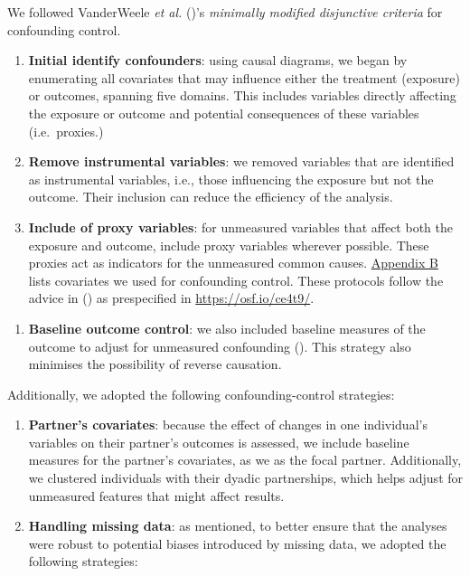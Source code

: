 \documentclass[
  singlecolumn]{article}
\providecommand{\tightlist}{%
  \setlength{\itemsep}{0pt}\setlength{\parskip}{0pt}}\usepackage{longtable,booktabs,array}
\begin{document}
We followed VanderWeele \emph{et al.}
()'s \emph{minimally modified
disjunctive criteria} for confounding control.

\begin{enumerate}
\def\labelenumi{\arabic{enumi}.}
\item
  \textbf{Initial identify confounders}: using causal diagrams, we began
  by enumerating all covariates that may influence either the treatment
  (exposure) or outcomes, spanning five domains. This includes variables
  directly affecting the exposure or outcome and potential consequences
  of these variables (i.e.~proxies.)
\item
  \textbf{Remove instrumental variables}: we removed variables that are
  identified as instrumental variables, i.e., those influencing the
  exposure but not the outcome. Their inclusion can reduce the
  efficiency of the analysis.
\item
  \textbf{Include of proxy variables}: for unmeasured variables that
  affect both the exposure and outcome, include proxy variables wherever
  possible. These proxies act as indicators for the unmeasured common
  causes. \hyperref[appendix-demographics]{Appendix B} lists covariates
  we used for confounding control. These protocols follow the advice in
  () as prespecified
  in \url{https://osf.io/ce4t9/}.
\end{enumerate}

\begin{enumerate}
\def\labelenumi{\arabic{enumi}.}
\setcounter{enumi}{2}
\tightlist
\item
  \textbf{Baseline outcome control}: we also included baseline measures
  of the outcome to adjust for unmeasured confounding
  (). This
  strategy also minimises the possibility of reverse causation.
\end{enumerate}

Additionally, we adopted the following confounding-control strategies:

\begin{enumerate}
\def\labelenumi{\arabic{enumi}.}
\setcounter{enumi}{5}
\item
  \textbf{Partner's covariates}: because the effect of changes in one
  individual's variables on their partner's outcomes is assessed, we
  include baseline measures for the partner's covariates, as we as the
  focal partner. Additionally, we clustered individuals with their
  dyadic partnerships, which helps adjust for unmeasured features that
  might affect results.
\item
  \textbf{Handling missing data}: as mentioned, to better ensure that
  the analyses were robust to potential biases introduced by missing
  data, we adopted the following strategies:
\end{enumerate}
\end{document}

